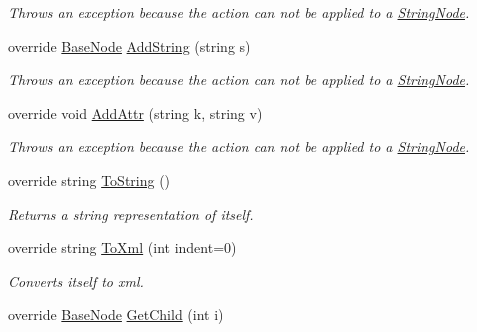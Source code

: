 \begin{DoxyCompactItemize}
\begin{DoxyCompactList}\small\item\em Throws an exception because the action can not be applied to a \hyperlink{class_x_m_leru_handleru_1_1_string_node}{String\+Node}. \end{DoxyCompactList}\item 
\hypertarget{class_x_m_leru_handleru_1_1_string_node_a5eb5f6d350d6fe0561e9bee5370f9038}{}override \hyperlink{class_x_m_leru_handleru_1_1_base_node}{Base\+Node} \hyperlink{class_x_m_leru_handleru_1_1_string_node_a5eb5f6d350d6fe0561e9bee5370f9038}{Add\+String} (string s)\label{class_x_m_leru_handleru_1_1_string_node_a5eb5f6d350d6fe0561e9bee5370f9038}

\begin{DoxyCompactList}\small\item\em Throws an exception because the action can not be applied to a \hyperlink{class_x_m_leru_handleru_1_1_string_node}{String\+Node}. \end{DoxyCompactList}\item 
\hypertarget{class_x_m_leru_handleru_1_1_string_node_ad90914dceb59dd26271f5266b2d899ca}{}override void \hyperlink{class_x_m_leru_handleru_1_1_string_node_ad90914dceb59dd26271f5266b2d899ca}{Add\+Attr} (string k, string v)\label{class_x_m_leru_handleru_1_1_string_node_ad90914dceb59dd26271f5266b2d899ca}

\begin{DoxyCompactList}\small\item\em Throws an exception because the action can not be applied to a \hyperlink{class_x_m_leru_handleru_1_1_string_node}{String\+Node}. \end{DoxyCompactList}\item 
override string \hyperlink{class_x_m_leru_handleru_1_1_string_node_aeefff8d4054ec20dc817b7cda8130cd6}{To\+String} ()
\begin{DoxyCompactList}\small\item\em Returns a string representation of itself. \end{DoxyCompactList}\item 
override string \hyperlink{class_x_m_leru_handleru_1_1_string_node_ac8507d872f9ad6789758b080894ad78f}{To\+Xml} (int indent=0)
\begin{DoxyCompactList}\small\item\em Converts itself to xml. \end{DoxyCompactList}\item 
\hypertarget{class_x_m_leru_handleru_1_1_string_node_a4b06ece089aaaaa5b5d77fd4768ff12b}{}override \hyperlink{class_x_m_leru_handleru_1_1_base_node}{Base\+Node} \hyperlink{class_x_m_leru_handleru_1_1_string_node_a4b06ece089aaaaa5b5d77fd4768ff12b}{Get\+Child} (int i)\label{class_x_m_leru_handleru_1_1_string_node_a4b06ece089aaaaa5b5d77fd4768ff12b}


\end{DoxyCompactItemize}

